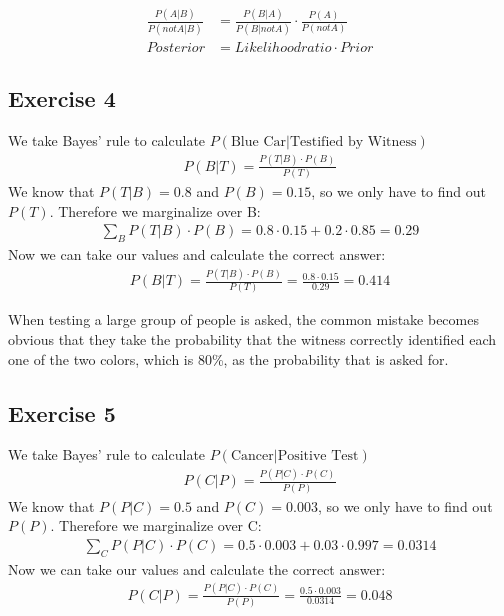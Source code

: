 \begin{align*}
\frac{P(A|B)}{P(not A|B)} & = \frac{P(B|A)}{P(B|not A)} \cdot \frac{P(A)}{P(not A)} \\
Posterior & = Likelihoodratio \cdot Prior
\end{align*}


\subsection*{Exercise 4}

We take Bayes' rule to calculate $P(\mbox{Blue Car}|\mbox{Testified by Witness})$
\begin{align*}
P(B|T) = \frac{P(T|B) \cdot P(B)}{P(T)}
\end{align*}
We know that $P(T|B) = 0.8$ and $P(B) = 0.15$, so we only have to find out $P(T)$. Therefore we marginalize over B:
\begin{align*}
\sum_{B}{P(T|B) \cdot P(B)} = 0.8 \cdot 0.15 + 0.2 \cdot 0.85 = 0.29
\end{align*}
Now we can take our values and calculate the correct answer:
\begin{align*}
P(B|T) = \frac{P(T|B) \cdot P(B)}{P(T)} = \frac{0.8 \cdot 0.15}{0.29} = 0.414
\end{align*}

When testing a large group of people is asked, the common mistake becomes obvious that they take the probability that the witness correctly identified each one of the two colors, which is 80\%, as the probability that is asked for.

\setcounter{equation}{0}

\subsection*{Exercise 5}

We take Bayes' rule to calculate $P(\mbox{Cancer}|\mbox{Positive Test})$
\begin{align*}
P(C|P) = \frac{P(P|C) \cdot P(C)}{P(P)}
\end{align*}
We know that $P(P|C) = 0.5$ and $P(C) = 0.003$, so we only have to find out $P(P)$. Therefore we marginalize over C:
\begin{align*}
\sum_{C}{P(P|C) \cdot P(C)} = 0.5 \cdot 0.003 + 0.03 \cdot 0.997 = 0.0314
\end{align*}
Now we can take our values and calculate the correct answer:
\begin{align*}
P(C|P) = \frac{P(P|C) \cdot P(C)}{P(P)} = \frac{0.5 \cdot 0.003}{0.0314} = 0.048
\end{align*}

